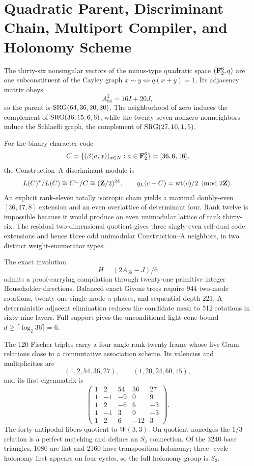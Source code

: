 \section{Quadratic Parent, Discriminant Chain, Multiport Compiler, and Holonomy Scheme}
\label{sec:bt3813-3820}

The thirty-six nonsingular vectors of the minus-type quadratic space
$({\bf F}_2^6,q)$ are one subconstituent of the Cayley graph
$x\sim y\Leftrightarrow q(x+y)=1$. Its adjacency matrix obeys
\[
 A_{64}^2=16I+20J,
\]
so the parent is ${\rm SRG}(64,36,20,20)$. The neighborhood of zero induces
the complement of ${\rm SRG}(36,15,6,6)$, while the twenty-seven nonzero
nonneighbors induce the Schlaefli graph, the complement of
${\rm SRG}(27,10,1,5)$.

For the binary character code
\[
 C=\{(\beta(a,x))_{x\in N}:a\in{\bf F}_2^6\}=[36,6,16],
\]
the Construction--A discriminant module is
\[
 L(C)^*/L(C)\cong C^\perp/C\cong({\bf Z}/2)^{24},
 \qquad q_L(c+C)=\operatorname{wt}(c)/2\pmod{2{\bf Z}}.
\]
An explicit rank-eleven totally isotropic chain yields a maximal doubly-even
$[36,17,8]$ extension and an even overlattice of determinant four. Rank
twelve is impossible because it would produce an even unimodular lattice of
rank thirty-six. The residual two-dimensional quotient gives three
singly-even self-dual code extensions and hence three odd unimodular
Construction--A neighbors, in two distinct weight-enumerator types.

The exact involution
\[
 H=(2A_{36}-J)/6
\]
admits a proof-carrying compilation through twenty-one primitive integer
Householder directions. Balanced exact Givens trees require 944 two-mode
rotations, twenty-one single-mode $\pi$ phases, and sequential depth 221. A
deterministic adjacent elimination reduces the candidate mesh to 512 rotations
in sixty-nine layers. Full support gives the unconditional light-cone bound
$d\geq\lceil\log_2 36\rceil=6$.

The 120 Fischer triples carry a four-angle rank-twenty frame whose five Gram
relations close to a commutative association scheme. Its valencies and
multiplicities are
\[
 (1,2,54,36,27),\qquad(1,20,24,60,15),
\]
and its first eigenmatrix is
\[
\begin{pmatrix}
1&2&54&36&27\\
1&-1&-9&0&9\\
1&2&-6&6&-3\\
1&-1&3&0&-3\\
1&2&6&-12&3
\end{pmatrix}.
\]
The forty antipodal fibers quotient to $W(3,3)$. On quotient nonedges the
$1/3$ relation is a perfect matching and defines an $S_3$ connection. Of the
3240 base triangles, 1080 are flat and 2160 have transposition holonomy; three-
cycle holonomy first appears on four-cycles, so the full holonomy group is
$S_3$.


